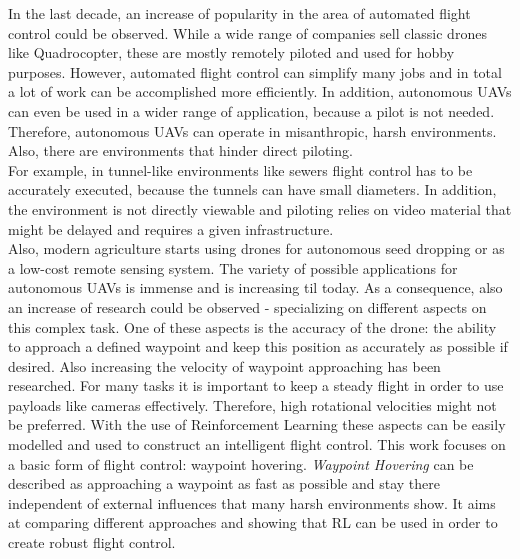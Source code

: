 In the last decade, an increase of popularity in the area of automated flight
control could be observed. While a wide range of companies sell classic
drones like Quadrocopter, these are mostly remotely piloted and used for
hobby purposes.
However, automated flight control can simplify many jobs and in total a
lot of work can be accomplished more efficiently.
In addition, autonomous UAVs can even be used in a wider range of application,
because a pilot is not needed.
Therefore, autonomous UAVs can operate in misanthropic, harsh environments.
Also, there are environments that hinder direct piloting.\\
For example, in tunnel-like environments like sewers flight control has to be accurately
executed, because the tunnels can have small diameters. In addition,
the environment is not directly viewable and piloting relies on video material
that might be delayed and requires a given infrastructure. \\
Also, modern agriculture starts using drones for autonomous seed dropping or
as a low-cost remote sensing system. The variety of possible applications 
for autonomous UAVs is immense and is increasing til today.
As a consequence, also an increase of research could be observed - specializing 
on different aspects on this complex task.
One of these aspects is the accuracy of the drone: the ability to approach 
a defined waypoint and keep this position as accurately as possible if desired.
Also increasing the velocity of waypoint approaching has been researched.
For many tasks it is important to keep a steady flight in order to
use payloads like cameras effectively.
Therefore, high rotational velocities might not be preferred. 
With the use of Reinforcement Learning these aspects can be easily modelled
and used to construct an intelligent flight control.
This work focuses on a basic form of flight control: waypoint hovering.
\emph{Waypoint Hovering} can be described as approaching a waypoint as fast as 
possible and stay there independent of external influences that many harsh
environments show. It aims at comparing different approaches and showing
that RL can be used in order to create robust flight control.

